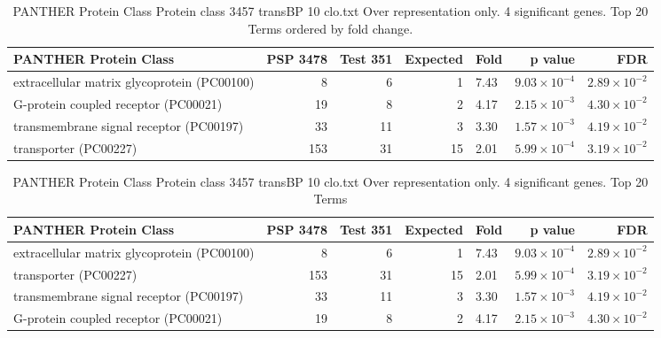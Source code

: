 

\begin{table}[ht]
\centering
\begin{adjustbox}{width=\textwidth}
\begin{tabular}{lrrrlrr}
  \hline
PANTHER Protein Class & PSP 3478 & Test 351 & Expected & Fold & p value & FDR \\ 
  \hline
extracellular matrix glycoprotein (PC00100) & 8 & 6 & 1 & 7.43 & $9.03 \times 10^{-4}$ & $2.89 \times 10^{-2}$ \\ 
  G-protein coupled receptor (PC00021) & 19 & 8 & 2 & 4.17 & $2.15 \times 10^{-3}$ & $4.30 \times 10^{-2}$ \\ 
  transmembrane signal receptor (PC00197) & 33 & 11 & 3 & 3.30 & $1.57 \times 10^{-3}$ & $4.19 \times 10^{-2}$ \\ 
  transporter (PC00227) & 153 & 31 & 15 & 2.01 & $5.99 \times 10^{-4}$ & $3.19 \times 10^{-2}$ \\ 
   \hline
\end{tabular}
\end{adjustbox}
\caption{PANTHER Protein Class Protein class 3457 transBP 10 clo.txt Over representation only. 4 significant genes. Top 20 Terms ordered by fold change. } 
\label{tab:PANTHER Protein Class Protein class 3457 transBP 10 clo.txt Over representation only. 4 significant genes. Top 20 Terms ordered by fold change. }
\end{table}


\begin{table}[ht]
\centering
\begin{adjustbox}{width=\textwidth}
\begin{tabular}{lrrrlrr}
  \hline
PANTHER Protein Class & PSP 3478 & Test 351 & Expected & Fold & p value & FDR \\ 
  \hline
extracellular matrix glycoprotein (PC00100) & 8 & 6 & 1 & 7.43 & $9.03 \times 10^{-4}$ & $2.89 \times 10^{-2}$ \\ 
  transporter (PC00227) & 153 & 31 & 15 & 2.01 & $5.99 \times 10^{-4}$ & $3.19 \times 10^{-2}$ \\ 
  transmembrane signal receptor (PC00197) & 33 & 11 & 3 & 3.30 & $1.57 \times 10^{-3}$ & $4.19 \times 10^{-2}$ \\ 
  G-protein coupled receptor (PC00021) & 19 & 8 & 2 & 4.17 & $2.15 \times 10^{-3}$ & $4.30 \times 10^{-2}$ \\ 
   \hline
\end{tabular}
\end{adjustbox}
\caption{PANTHER Protein Class Protein class 3457 transBP 10 clo.txt Over representation only. 4 significant genes. Top 20 Terms} 
\label{tab:PANTHER Protein Class Protein class 3457 transBP 10 clo.txt Over representation only. 4 significant genes. Top 20 Terms}
\end{table}

